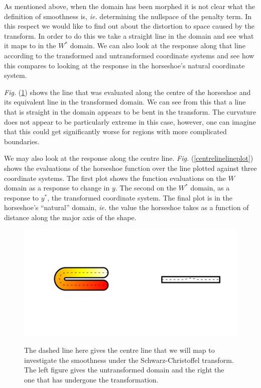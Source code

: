 \documentclass[a4paper,10pt]{amsart}
\newcommand{\sch}{Schwarz-Christoffel }
\newcommand{\Fig}[1]{\emph{Fig.} (\ref{#1})}
\begin{document}
As mentioned above, when the domain has been morphed it is not clear what the definition of smoothness is, \emph{ie.} determining the nullspace of the penalty term. In this respect we would like to find out about the distortion to space caused by the transform. In order to do this we take a straight line in the domain and see what it maps to in the $W^*$ domain. We can also look at the response along that line according to the transformed and untransformed coordinate systems and see how this compares to looking at the response in the horseshoe's natural coordinate system.

\Fig{horseshoecentreline} shows the line that was evaluated along the centre of the horseshoe and its equivalent line in the transformed domain. We can see from this that a line that is straight in the domain appears to be bent in the transform. The curvature does not appear to be particularly extreme in this case, however, one can imagine that this could get significantly worse for regions with more complicated boundaries.

We may also look at the response along the centre line. \Fig{centrelinelineplot} shows the evaluations of the horseshoe function over the line plotted against three coordinate systems. The first plot shows the function evaluations on the $W$ domain as a response to change in $y$. The second on the $W^*$ domain, as a response to $y^*$, the transformed coordinate system. The final plot is in the horseshoe's ``natural'' domain, \emph{ie.} the value the horseshoe takes as a function of distance along the major axis of the shape.

\begin{figure}
\centering
\includegraphics[trim=0.5in 1in 0in 1in]{figs/horseshoecentreline.pdf} \\
\caption{The dashed line here gives the centre line that we will map to investigate the smoothness under the \sch transform. The left figure gives the untransformed domain and the right the one that has undergone the transformation.}
\label{horseshoecentreline}
\end{figure}
\end{document}
